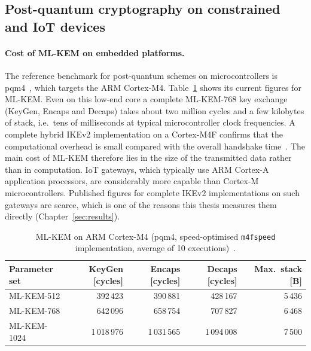 \subsection{Post-quantum cryptography on constrained and IoT devices}
\label{sec:sota-iot}

\paragraph{Cost of ML-KEM on embedded platforms.}
The reference benchmark for post-quantum schemes on microcontrollers is
pqm4~\cite{pqm4}, which targets the ARM Cortex-M4. Table~\ref{tab:pqm4}
shows its current figures for ML-KEM. Even on this low-end core a complete
ML-KEM-768 key exchange (KeyGen, Encaps and Decaps) takes about two million
cycles and a few kilobytes of stack, i.e.\ tens of milliseconds at typical
microcontroller clock frequencies. A complete hybrid IKEv2 implementation on
a Cortex-M4F confirms that the computational overhead is small compared with
the overall handshake time~\cite{bahaaeldin2026}. The main cost of ML-KEM
therefore lies in the size of the transmitted data rather than in computation.
IoT gateways, which typically use ARM Cortex-A application processors, are
considerably more capable than Cortex-M microcontrollers. Published figures
for complete IKEv2 implementations on such gateways are scarce, which is one
of the reasons this thesis measures them directly (Chapter~\ref{sec:results}).

\begin{table}[!h] \centering
    \caption{ML-KEM on ARM Cortex-M4 (pqm4, speed-optimised \texttt{m4fspeed}
    implementation, average of 10 executions)~\cite{pqm4bench}.}
    \label{tab:pqm4}
    \begin{tabular}{| l | r | r | r | r |} \hline
        Parameter set & KeyGen [cycles] & Encaps [cycles] & Decaps [cycles] & Max.\ stack [B] \\ \hline\hline
        ML-KEM-512  &   392\,423 &   390\,881 &   428\,167 & 5\,436 \\ \hline
        ML-KEM-768  &   642\,096 &   658\,754 &   707\,827 & 6\,468 \\ \hline
        ML-KEM-1024 & 1\,018\,976 & 1\,031\,565 & 1\,094\,008 & 7\,500 \\ \hline
    \end{tabular}
\end{table}

